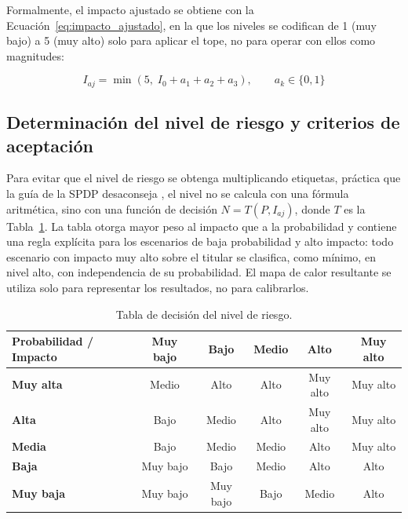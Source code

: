 Formalmente, el impacto ajustado se obtiene con la Ecuación~\ref{eq:impacto_ajustado}, en la que los niveles se codifican de 1 (muy bajo) a 5 (muy alto) solo para aplicar el tope, no para operar con ellos como magnitudes:

\begin{equation}
\label{eq:impacto_ajustado}
I_{aj} = \min\left(5,\; I_0 + a_1 + a_2 + a_3\right), \qquad a_k \in \{0, 1\}
\end{equation}

\subsection{Determinación del nivel de riesgo y criterios de aceptación}

Para evitar que el nivel de riesgo se obtenga multiplicando etiquetas, práctica que la guía de la SPDP desaconseja \cite{spdp2026guiav2}, el nivel no se calcula con una fórmula aritmética, sino con una función de decisión $N = T(P, I_{aj})$, donde $T$ es la Tabla~\ref{tab:matriz_nivel}. La tabla otorga mayor peso al impacto que a la probabilidad y contiene una regla explícita para los escenarios de baja probabilidad y alto impacto: todo escenario con impacto muy alto sobre el titular se clasifica, como mínimo, en nivel alto, con independencia de su probabilidad. El mapa de calor resultante se utiliza solo para representar los resultados, no para calibrarlos.

\begin{table}[htbp]
  \centering
  \caption{Tabla de decisión del nivel de riesgo.}
  \label{tab:matriz_nivel}
  \small
  \renewcommand{\arraystretch}{1.35}
  \begin{tabular}{|l|c|c|c|c|c|}
    \hline
    \textbf{Probabilidad / Impacto} & \textbf{Muy bajo} & \textbf{Bajo} & \textbf{Medio} & \textbf{Alto} & \textbf{Muy alto} \\
    \hline
    \textbf{Muy alta} & Medio & Alto & Alto & Muy alto & Muy alto \\
    \hline
    \textbf{Alta}     & Bajo & Medio & Alto & Muy alto & Muy alto \\
    \hline
    \textbf{Media}    & Bajo & Medio & Medio & Alto & Muy alto \\
    \hline
    \textbf{Baja}     & Muy bajo & Bajo & Medio & Alto & Alto \\
    \hline
    \textbf{Muy baja} & Muy bajo & Muy bajo & Bajo & Medio & Alto \\
    \hline
  \end{tabular}
  \par\vspace{2pt}
  \raggedright
\end{table}

